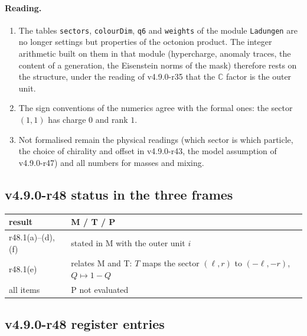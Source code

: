 \paragraph{Reading.}
\begin{enumerate}[leftmargin=2em]
\item The tables \texttt{sectors}, \texttt{colourDim}, \texttt{q6} and \texttt{weights} of the module \texttt{Ladungen} are no longer
settings but properties of the octonion product.  The integer arithmetic built on them in that module (hypercharge, anomaly traces, the
content of a generation, the Eisenstein norms of the mask) therefore rests on the structure, under the reading of v4.9.0-r35 that the
\(\mathbb C\) factor is the outer unit.
\item The sign conventions of the numerics agree with the formal ones: the sector \((1,1)\) has charge \(0\) and rank \(1\).
\item Not formalised remain the physical readings (which sector is which particle, the choice of chirality and offset in v4.9.0-r43, the
model assumption of v4.9.0-r47) and all numbers for masses and mixing.
\end{enumerate}

\subsection*{v4.9.0-r48 status in the three frames}
\label{subsec:v490-r48-frames}

\begin{center}
\small
\begin{tabular}{@{}>{\raggedright\arraybackslash}p{}>{\raggedright\arraybackslash}p{}@{}}
\toprule
result & M / T / P\\
\midrule
r48.1(a)--(d), (f) & stated in M with the outer unit \(i\)\\
r48.1(e) & relates M and T: \(T\) maps the sector \((\ell,r)\) to \((-\ell,-r)\), \(Q\mapsto1-Q\)\\
all items & P not evaluated\\
\bottomrule
\end{tabular}
\end{center}

\subsection*{v4.9.0-r48 register entries}
\label{subsec:v490-r48-register}

